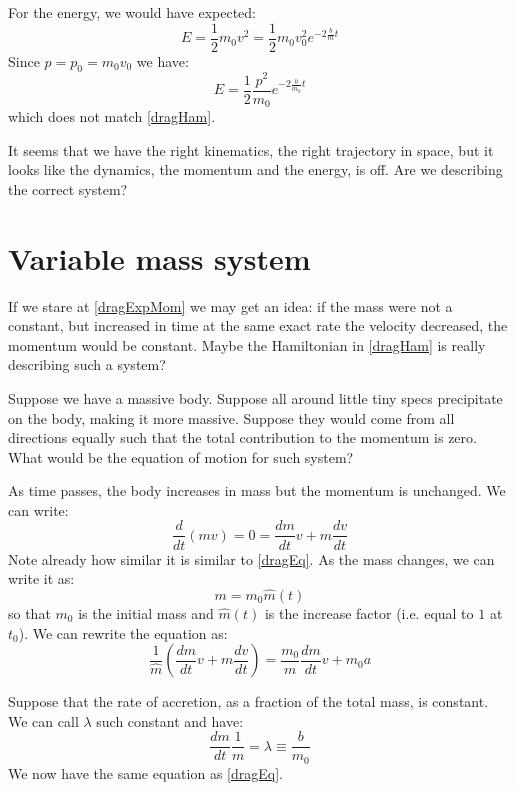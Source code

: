 \documentclass[aps,pra,10pt,floatfix,nofootinbib]{revtex4-1}
\theoremstyle{definition}
\begin{document}
For the energy, we would have expected:
\begin{equation*}
E = \frac{1}{2} m_0 v^2 = \frac{1}{2} m_0 v_0^2 e^{-2\frac{b}{m}t}
\end{equation*}
Since $p = p_0 = m_0 v_0$ we have:
\begin{equation*}
E = \frac{1}{2} \frac{p^2}{m_0} e^{-2\frac{b}{m_0}t}
\end{equation*}
which does not match \eqref{dragHam}.

It seems that we have the right kinematics, the right trajectory in space, but it looks like the dynamics, the momentum and the energy, is off. Are we describing the correct system?

\section{Variable mass system}

If we stare at \eqref{dragExpMom} we may get an idea: if the mass were not a constant, but increased in time at the same exact rate the velocity decreased, the momentum would be constant. Maybe the Hamiltonian in \eqref{dragHam} is really  describing such a system?

Suppose we have a massive body. Suppose all around little tiny specs precipitate on the body, making it more massive. Suppose they would come from all directions equally such that the total contribution to the momentum is zero. What would be the equation of motion for such system?

As time passes, the body increases in mass but the momentum is unchanged. We can write:
\begin{equation}
\label{accFma}
\frac{d}{dt}(m v) = 0 = \frac{dm}{dt}v + m \frac{dv}{dt}
\end{equation}
Note already how similar it is similar to \eqref{dragEq}. As the mass changes, we can write it as:
\begin{equation}
m = m_0 \hat{m}(t)
\end{equation}
so that $m_0$ is the initial mass and $\hat{m}(t)$ is the increase factor (i.e. equal to $1$ at $t_0$). We can rewrite the equation as:
\begin{equation*}
\frac{1}{\hat{m}} (\frac{dm}{dt}v + m \frac{dv}{dt}) = \frac{m_0}{m}\frac{dm}{dt}v + m_0 a
\end{equation*}

Suppose that the rate of accretion, as a fraction of the total mass, is constant. We can call $\lambda$ such constant and have:
\begin{equation}
\label{accMass}
\frac{dm}{dt} \frac{1}{m} = \lambda \equiv \frac{b}{m_0}
\end{equation}
We now have the same equation as \eqref{dragEq}.
\end{document}
